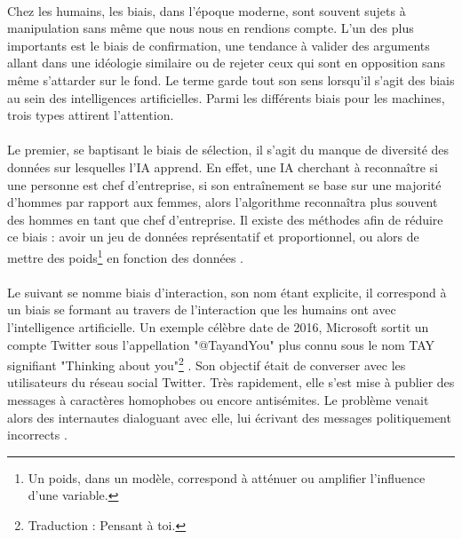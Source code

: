 \documentclass[10pt, french, a4paper]{article}
\begin{document}
\paragraph{}
Chez les humains, les biais, dans l’époque moderne, sont souvent sujets à manipulation sans même que nous nous en rendions compte. L’un des plus importants est le biais de confirmation, une tendance à valider des arguments allant dans une idéologie similaire ou de rejeter ceux qui sont en opposition sans même s’attarder sur le fond. Le terme garde tout son sens lorsqu’il s’agit des biais au sein des intelligences artificielles. Parmi les différents biais pour les machines, trois types attirent l’attention.

\paragraph{}
Le premier, se baptisant le biais de sélection, il s’agit du manque de diversité des données sur lesquelles l'IA apprend. En effet, une IA cherchant à reconnaître si une personne est chef d’entreprise, si son entraînement se base sur une majorité d’hommes par rapport aux femmes, alors l’algorithme reconnaîtra plus souvent des hommes en tant que chef d’entreprise. Il existe des méthodes afin de réduire ce biais : avoir un jeu de données représentatif et proportionnel, ou alors de mettre des poids\footnote{Un poids, dans un modèle, correspond à atténuer ou amplifier l'influence d'une variable.} en fonction des données \citep{tran_selection_2017}.

\paragraph{}
Le suivant se nomme biais d’interaction, son nom étant explicite, il correspond à un biais se formant au travers de l’interaction que les humains ont avec l’intelligence artificielle. Un exemple célèbre date de 2016, Microsoft sortit un compte Twitter sous l’appellation "@TayandYou" plus connu sous le nom TAY signifiant "Thinking about you"\footnote{Traduction : Pensant à toi.} . Son objectif était de converser avec les utilisateurs du réseau social Twitter. Très rapidement, elle s’est mise à publier des messages à caractères homophobes ou encore antisémites. Le problème venait alors des internautes dialoguant avec elle, lui écrivant des messages politiquement incorrects \citep{tual_peine_2016}.
\end{document}
